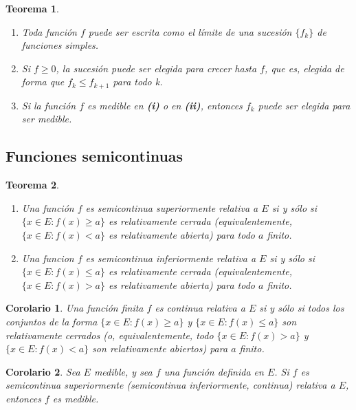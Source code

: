 \documentclass{article}
\newtheorem{theorem}{Teorema}
\newtheorem{corollary}{Corolario}
\begin{document}
\begin{theorem}


\begin{enumerate}[label=(\roman*)]

\item Toda función $f$ puede ser escrita como el límite de una sucesión $\{f_k \}$ de funciones simples.
\item Si $f \geq 0$, la sucesión puede ser elegida para crecer hasta $f$, que es, elegida de forma que $f_k \leq f_{k+1}$ para todo k.
\item Si la función $f$ es medible en \textbf{(i)} o en \textbf{(ii)}, entonces $f_k$ puede ser elegida para ser medible.

\end{enumerate}
\end{theorem}

\subsection{Funciones semicontinuas}

\begin{theorem}
\begin{enumerate}[label=(\roman*)]

\item Una función $f$ es semicontinua superiormente relativa a $E$ si y sólo si $\{x \in E : f(x) \geq a\}$ es relativamente cerrada (equivalentemente, $\{x \in E : f(x) < a\}$ es relativamente abierta) para todo $a$ finito.
\item Una funcion $f$ es semicontinua inferiormente relativa a $E$ si y sólo si $\{x \in E : f(x) \leq a\}$ es relativamente cerrada (equivalentemente, $\{x \in E : f(x) > a\}$ es relativamente abierta) para todo $a$ finito.
\end{enumerate}
\end{theorem}

\begin{corollary}
Una función finita $f$ es continua relativa a $E$ si y sólo si todos los conjuntos de la forma $\{x \in E : f(x) \geq a \}$ y $\{x \in E : f(x) \leq a\}$ son relativamente cerrados (o, equivalentemente, todo $\{x \in E : f(x) > a\}$ y $\{x \in E : f(x) < a\}$ son relativamente abiertos) para $a$ finito.
\end{corollary}

\begin{corollary}
Sea $E$ medible, y sea $f$ una función definida en $E$. Si $f$ es semicontinua superiormente (semicontinua inferiormente, continua) relativa a $E$, entonces $f$ es medible.
\end{corollary}
\end{document}
